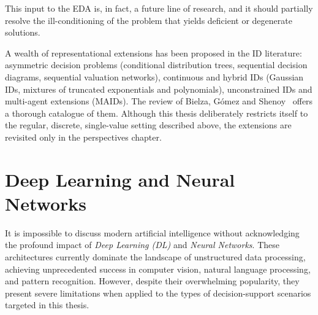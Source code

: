 This input to the EDA is, in fact, a future line of research, and it should partially resolve the ill-conditioning of the problem that yields deficient or degenerate solutions.

A wealth of representational extensions has been proposed in the ID literature: asymmetric decision problems (conditional
distribution trees, sequential decision diagrams, sequential
valuation networks), continuous and hybrid IDs (Gaussian IDs,
mixtures of truncated exponentials and polynomials), unconstrained
IDs and multi-agent extensions (MAIDs). The review of Bielza,
G{\'o}mez and Shenoy~\cite{bielza2011review} offers a thorough
catalogue of them. Although this thesis deliberately restricts
itself to the regular, discrete, single-value setting described
above, the extensions are revisited only in the perspectives
chapter.

\section{Deep Learning and Neural Networks}

It is impossible to discuss modern artificial intelligence without acknowledging the profound impact of \emph{Deep Learning (DL)} and \emph{Neural Networks}. These architectures currently dominate the landscape of unstructured data processing, achieving unprecedented success in computer vision, natural language processing, and pattern recognition. However, despite their overwhelming popularity, they present severe limitations when applied to the types of decision-support scenarios targeted in this thesis.

